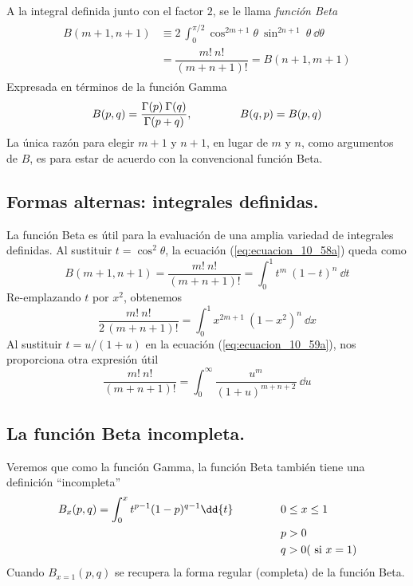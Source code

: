A la integral definida junto con el factor $2$, se le llama \emph{función Beta}
\begin{align}
\begin{aligned}
B(m+1, n+1) &\equiv 2 \: \int_{0}^{\pi/2} \cos^{2m+1} \theta \: \sin^{2n+1} \: \theta \: \dd \theta \\
&= \dfrac{m! \: n!}{(m+n+1)!} = B(n+1, m+1)
\label{eq:ecuacion_10_58a}
\end{aligned}
\end{align}
Expresada en términos de la función Gamma
\begin{equation}
B(p, q) = \dfrac{\Gamma(p) \: \Gamma(q)}{\Gamma(p+q)}, \hspace{1.5cm} B(q, p) = B(p, q)
\label{eq:ecuacion_10_58b}
\end{equation}
La única razón para elegir $m + 1$ y $n + 1$, en lugar de $m$ y $n$, como argumentos de $B$, es para estar de acuerdo con la convencional función Beta.
\subsection{Formas alternas: integrales definidas.}
La función Beta es útil para la evaluación de una amplia variedad de integrales definidas. Al sustituir $t= \cos^{2} \theta$, la ecuación (\ref{eq:ecuacion_10_58a}) queda como
\begin{equation}
B(m+1, n+1) = \dfrac{m! \: n!}{(m+n+1)!} = \int_{0}^{1} t^{m} \: (1 - t)^{n} \: \dd{t}
\label{eq:ecuacion_10_59a}
\end{equation}
Re-emplazando $t$ por $x^{2}$, obtenemos
\begin{equation}
\dfrac{m! \: n!}{2 \, (m+n+1)!} = \int_{0}^{1} x^{2m+1} \: (1-x^{2})^{n} \: \dd{x}
\label{eq:ecuacion_10_59b}
\end{equation}
Al sustituir $t= u/(1+u)$ en la ecuación (\ref{eq:ecuacion_10_59a}), nos proporciona otra expresión útil
\begin{equation}
\dfrac{m! \: n!}{(m+n+1)!} = \int_{0}^{\infty} \dfrac{u^{m}}{(1+u)^{m+n+2}} \: \dd{u}
\label{eq:ecuacion_10_60}
\end{equation}
\subsection{La función Beta incompleta.}
Veremos que como la función Gamma, la función Beta también tiene una definición \enquote{incompleta}
\begin{align}
\begin{aligned}
B_{x}(p,q) = \int_{0}^{x} t^{p-1} (1-p)^{q-1} \dd{t} \hspace{1.5cm} & 0 \leq x \leq 1 \\
& p > 0 \\
& q > 0 (\text{ si } x=1)
\label{eq:ecuacion_10_67}
\end{aligned}
\end{align}
Cuando $B_{x=1}(p,q)$ se recupera la forma regular (completa) de la función Beta.
